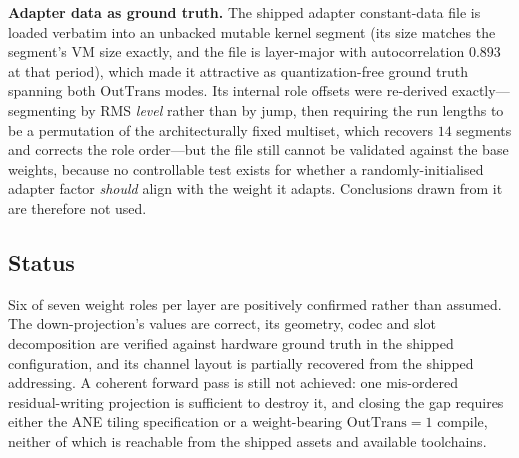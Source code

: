 \textbf{Adapter data as ground truth.} The shipped adapter constant-data file is loaded verbatim into
an unbacked mutable kernel segment (its size matches the segment's VM size exactly, and the file is
layer-major with autocorrelation $0.893$ at that period), which made it attractive as
quantization-free ground truth spanning both $\mathrm{OutTrans}$ modes. Its internal role offsets
were re-derived exactly---segmenting by RMS \emph{level} rather than by jump, then requiring the run
lengths to be a permutation of the architecturally fixed multiset, which recovers $14$ segments and
corrects the role order---but the file still cannot be validated against the base weights, because no
controllable test exists for whether a randomly-initialised adapter factor \emph{should} align with
the weight it adapts. Conclusions drawn from it are therefore not used.

\subsection{Status}

Six of seven weight roles per layer are positively confirmed rather than assumed. The
down-projection's values are correct, its geometry, codec and slot decomposition are verified against
hardware ground truth in the shipped configuration, and its channel layout is partially recovered
from the shipped addressing. A coherent forward pass is still not achieved: one mis-ordered
residual-writing projection is sufficient to destroy it, and closing the gap requires either the ANE
tiling specification or a weight-bearing $\mathrm{OutTrans}{=}1$ compile, neither of which is
reachable from the shipped assets and available toolchains.
